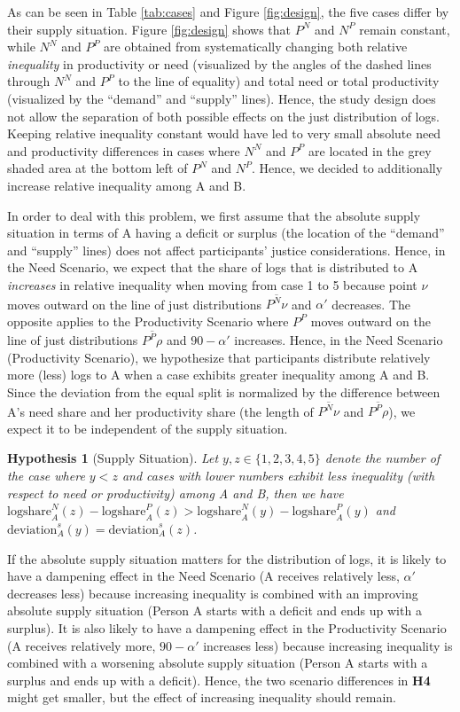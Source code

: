 \documentclass[smallcondensed]{svjour3}
\newtheorem{Hypothesis}{Hypothesis}
\begin{document}
%
As can be seen in Table \ref{tab:cases} and Figure \ref{fig:design}, the five cases differ by their supply situation. Figure \ref{fig:design} shows that $P^N$ and $N^P$ remain constant, while $N^N$ and $P^P$ are obtained from systematically changing both relative \textit{inequality} in productivity or need (visualized by the angles of the dashed lines through $N^N$ and $P^P$ to the line of equality) and total need or total productivity (visualized by the ``demand'' and ``supply'' lines). Hence, the study design does not allow the separation of both possible effects on the just distribution of logs. Keeping relative inequality constant would have led to very small absolute need and productivity differences in cases where $N^N$ and $P^P$ are located in the grey shaded area at the bottom left of $P^N$ and $N^P$. Hence, we decided to additionally increase relative inequality among A and B.\par
%
In order to deal with this problem, we first assume that the absolute supply situation in terms of A having a deficit or surplus (the location of the ``demand'' and ``supply'' lines) does not affect participants' justice considerations. Hence, in the Need Scenario, we expect that the share of logs that is distributed to A \textit{increases} in relative inequality when moving from case 1 to 5 because point $\nu$ moves outward on the line of just distributions $\overline{P^N\nu}$ and $\alpha'$ decreases. The opposite applies to the Productivity Scenario where $P^P$ moves outward on the line of just distributions $\overline{P^P\rho}$ and $90-\alpha'$ increases. Hence, in the Need Scenario (Productivity Scenario), we hypothesize that participants distribute relatively more (less) logs to A when a case exhibits greater inequality among A and B. Since the deviation from the equal split is normalized by the difference between A's need share and her productivity share (the length of $\overline{P^N\nu}$ and $\overline{P^P\rho}$), we expect it to be independent of the supply situation.
%
\begin{Hypothesis}[Supply Situation] Let $y,z\in\{1,2,3,4,5\}$ denote the number of the case where $y<z$ and cases with lower numbers exhibit less inequality (with respect to need or productivity) among A and B, then we have $\mbox{logshare}_A^N(z)-\mbox{logshare}_A^P(z)>\mbox{logshare}_A^N(y)-\mbox{logshare}_A^P(y)$ and $\mbox{deviation}_A^s(y)=\mbox{deviation}_A^s(z)$.
\end{Hypothesis}
%
\par
%
If the absolute supply situation matters for the distribution of logs, it is likely to have a dampening effect in the Need Scenario (A receives relatively less, $\alpha'$ decreases less) because increasing inequality is combined with an improving absolute supply situation (Person A starts with a deficit and ends up with a surplus). It is also likely to have a dampening effect in the Productivity Scenario (A receives relatively more, $90-\alpha'$ increases less) because increasing inequality is combined with a worsening absolute supply situation (Person A starts with a surplus and ends up with a deficit). Hence, the two scenario differences in \textbf{H4} might get smaller, but the effect of increasing inequality should remain.\par
%
\end{document}
